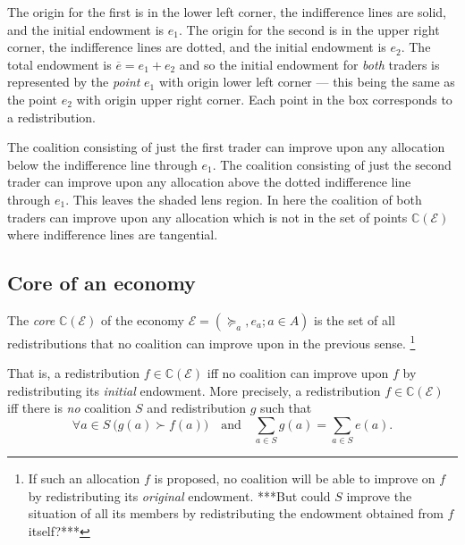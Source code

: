 \documentclass[a4paper]{amsart}
\theoremstyle{plain}
\theoremstyle{definition}
\theoremstyle{remark}
\begin{document}
The origin for the first is in the lower left corner, the indifference lines  are solid, and the initial endowment is $ e_1$.  The origin for the second is in the upper right corner, the indifference lines  are dotted, and the initial endowment is $ e_2$.  
The total endowment is $ \overline{e} = e_1 + e_2 $ and so the initial endowment for \emph{both} traders  is represented by 
 the \emph{point} $ e_1 $ with origin   lower left corner --- this being the same as the  point $ e_2 $ with origin   upper right corner.   Each point in the box corresponds to a redistribution.

The coalition consisting of just the first trader can improve upon any allocation below the indifference line through $ e_1 $.   The coalition consisting of just the second trader can improve upon   any allocation above the dotted indifference line through $ e_1 $.  This leaves the shaded lens region. In here the coalition of both traders can improve upon any allocation which is not in the set of points $ \mathbb{C} (\mathcal{E} ) $ where indifference lines are tangential.



\subsection{Core of an economy} The \emph{core} $ \mathbb{C} (\mathcal{E} ) $ of the economy $  \mathcal{E}   = (\succeq_a, e_a; a \in A )$ is the set  of all redistributions that no coalition can improve upon in the previous sense.%
\footnote{If such an allocation $ f $ is proposed, no coalition   will be able to improve on $ f $ by redistributing its \emph{original} endowment.   ***But could $ S $ improve the situation of all its members by redistributing the endowment obtained from $   f $ itself?***} 

\medskip
  That is, a redistribution $ f \in  \mathbb{C} (\mathcal{E} ) $ iff  no coalition can improve upon $ f $ by redistributing its \emph{initial} endowment.
More precisely, a redistribution $ f \in  \mathbb{C} (\mathcal{E} ) $ iff   there is   \emph{no} coalition $ S $ and redistribution  $ g $ 
such that
\begin{equation} \label{cnr}  
 \forall   a \in S\  \big(g(a) \succ f(a)\big)    \quad 
\text{and} \quad \sum_{a\in S}  g(a) =  \sum_{a\in S}  e(a).
\end{equation} 

\end{document}
